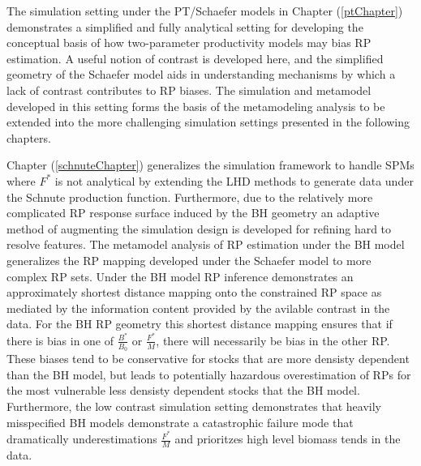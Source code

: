 \documentclass[12pt]{ucscthesis}
\begin{document}
%
The simulation setting under the PT/Schaefer models in Chapter (\ref{ptChapter}) 
demonstrates a simplified and fully analytical setting for developing the 
conceptual basis of how two-parameter productivity models may bias RP estimation. 
A useful notion of contrast is developed here, and the simplified geometry of the 
Schaefer model aids in understanding mechanisms by which a lack of contrast 
contributes to RP biases.
The simulation and metamodel developed in this setting forms the basis of the 
metamodeling analysis to be extended into the more challenging simulation settings 
presented in the following chapters.


%
Chapter (\ref{schnuteChapter}) generalizes the simulation framework to handle 
SPMs where $F^*$ is not analytical by extending the LHD methods to generate data 
under the Schnute production function. Furthermore, due to the relatively more 
complicated RP response surface induced by the BH geometry an adaptive method of 
augmenting the simulation design is developed for refining hard to resolve features. 
The metamodel analysis of RP estimation under the BH model generalizes the RP 
mapping developed under the Schaefer model to more complex RP sets. Under the 
BH model RP inference demonstrates  an approximately shortest distance mapping 
onto the constrained RP space as mediated by the information content provided 
by the avilable contrast in the data. For the BH RP geometry this shortest 
distance mapping ensures that if there is bias in one of $\frac{B^*}{B_0}$ or 
$\frac{F^*}{M}$, there will necessarily be bias in the other RP. These biases 
tend to be conservative for stocks that are more densisty dependent than the 
BH model, but leads to potentially hazardous overestimation of RPs for the most 
vulnerable less densisty dependent stocks that the BH model. Furthermore, the low 
contrast simulation setting demonstrates that heavily misspecified BH models 
demonstrate a catastrophic failure mode that dramatically underestimations $\frac{F^*}{M}$ and 
prioritzes high level biomass tends in the data. 
\end{document}
